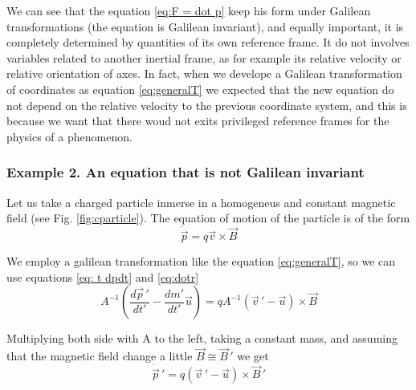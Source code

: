 \documentclass[11pt, letterpaper]{article}
\begin{document}
We can see that the equation \ref{eq:F = dot p} keep his form under Galilean transformations (the equation is Galilean invariant), and equally important, it is completely determined by quantities of its own reference frame. It do not involves variables related to another inertial frame, as for example its relative velocity  or relative orientation of axes. In fact, when we develope a Galilean transformation of coordinates as equation \ref{eq:generalT} we expected that the new equation do not depend on the relative velocity to the previous coordinate system, and this is because we want that there woud not exits privileged reference frames for the physics of a phenomenon.

\subsubsection*{Example 2. An equation that is not Galilean invariant}
Let us take a charged particle inmerse in a homogeneus and constant magnetic field (see Fig. \ref{fig:cparticle}). The equation of motion of the particle is of the form
\begin{equation}
	\dot{\vec{p}} = q\vec{v}\times \vec{B} \label{eq:motion1}
\end{equation}

We employ a galilean transformation like the equation \ref{eq:generalT}, so we can use equations \ref{eq: t dpdt} and \ref{eq:dotr}
\begin{equation}
	A^{-1} \left( \frac{d\vec{p}\,'}{dt'}-\frac{dm'}{dt'}\vec{u} \right) = q A^{-1}(\vec{v}\,'-\vec{u})\times \vec{B}
\end{equation}

Multiplying both side with A to the left, taking a constant mass, and assuming that the magnetic field change a little $\vec{B} \cong \vec{B}\,'$ we get
\begin{equation}
	\dot{\vec{p}}\,' = q (\vec{v}\,'-\vec{u})\times \vec{B}\,' \label{eq:motion2}
\end{equation}
\end{document}
